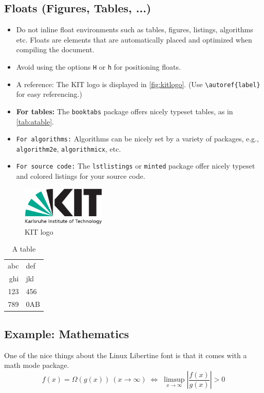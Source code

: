 \subsection{Floats (Figures, Tables, ...)}
\begin{itemize}
\item Do not inline float environments such as tables, figures, listings,
algorithms etc.
Floats are elements that are automatically placed and optimized when compiling
the document.
\item Avoid using the options \texttt{H} or \texttt{h} for positioning floats.
\item A reference: The KIT logo is displayed in \autoref{fig:kitlogo}. (Use
  \verb+\autoref{label}+ for easy referencing.)
\item \textbf{For tables:} The \texttt{booktabs} package offers nicely typeset
  tables, as in \autoref{tab:atable}.
\item \texttt{For algorithms:} Algorithms can be nicely set by a variety
  of packages, e.g., \texttt{algorithm2e}, \texttt{algorithmicx}, etc.
\item \texttt{For source code:} The \texttt{lstlistings} or \texttt{minted}
package offer nicely typeset and colored listings for your source code.
\end{itemize}

\begin{figure}
  \centering
  \includegraphics[width=4cm]{logos/kitlogo_en_cmyk}
  \caption{KIT logo}
  \label{fig:kitlogo}
\end{figure}

\begin{table}
  \centering
  \begin{tabular}{r l}
    \toprule
    abc & def \\
    ghi & jkl \\
    \midrule
    123 & 456 \\
    789 & 0AB \\
    \bottomrule
  \end{tabular}
  \caption{A table}
  \label{tab:atable}
\end{table}

\subsection{Example: Mathematics}
One of the nice things about the Linux Libertine font is that it comes with
a math mode package.
\begin{displaymath}
  f(x)=\Omega(g(x))\ (x\rightarrow\infty)\;\Leftrightarrow\;
  \limsup_{x \to \infty} \left|\frac{f(x)}{g(x)}\right|> 0
\end{displaymath}


